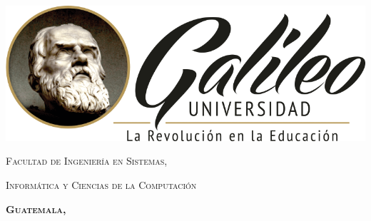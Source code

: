 \documentclass[
12pt, %
spanish, %
doublespacing, %
liststotoc, %
parskip, %
headsepline, %
table,
]{MastersDoctoralThesis} %
\author{José Jacobo \textsc{Del Valle Girón}} %
\begin{document}
\frontmatter %

\pagestyle{plain} %


\begin{titlepage}
\begin{center}

\begingroup\onehalfspacing

{\scshape\LARGE \authorname\par}\vspace{1.5cm} %

{\huge \bfseries \ttitle\par} %

\vspace{1.5cm}

\includegraphics[scale=0.5]{logo.png} %

\vspace{1.5cm}

{\scshape\Large \univname\par} %
{\scshape\Large Facultad de Ingeniería en Sistemas,}
{\scshape\Large Informática y Ciencias de la Computación\par}

{\scshape \Large \bfseries Guatemala, \the\year \par}

\endgroup
 
\vfill
\end{center}
\end{titlepage}

\end{document}
